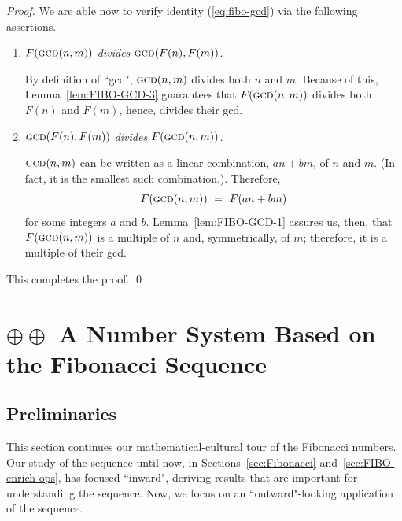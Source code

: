 \begin{proof}
\medskip

\noindent
We are able now to verify identity (\ref{eq:fibo-gcd}) via the following assertions.

\medskip

\begin{enumerate}
\item
{\em $F(\mbox{\sc gcd}(n,m))$ divides $\mbox{\sc gcd}(F(n), F(m))$.}

\smallskip

By definition of ``{\sc gcd}", $\mbox{\sc gcd}(n,m)$ divides both $n$ and $m$.  Because of this,
Lemma~\ref{lem:FIBO-GCD-3} guarantees that $F(\mbox{\sc gcd}(n,m))$ divides both $F(n)$ and $F(m)$, hence, divides their {\sc gcd}.

\medskip

\item
{\em $\mbox{\sc gcd}(F(n), F(m))$ divides $F(\mbox{\sc gcd}(n,m))$.}

\smallskip

$\mbox{\sc gcd}(n,m)$ can be written as a linear combination, $a n + b m$, of $n$ and $m$.  (In fact, it is the smallest such combination.). Therefore, 
\[ F(\mbox{\sc gcd}(n,m)) \ = \ F(a n + b m) \]
for some integers $a$ and $b$.  Lemma~\ref{lem:FIBO-GCD-1} assures us, then, that
$F(\mbox{\sc gcd}(n,m))$ is a multiple of $n$ and, symmetrically, of $m$; therefore, it is a multiple of their {\sc gcd}. 
\end{enumerate}
This completes the proof.   \qed
\end{proof}


\section{$\oplus \oplus$ A Number System Based on the Fibonacci Sequence}
\label{sec:numerals-special-families}
\label{sec:Fibo-numbers}

\subsection{Preliminaries}
\label{sec:FIBO-num-intro}

This section continues our mathematical-cultural tour of the Fibonacci numbers.  Our study of the sequence until now, in Sections~\ref{sec:Fibonacci} and~\ref{sec:FIBO-enrich-ops}, has focused ``inward", deriving results that are important for understanding the sequence.  Now, we focus on an ``outward"-looking application of the sequence.

\medskip

